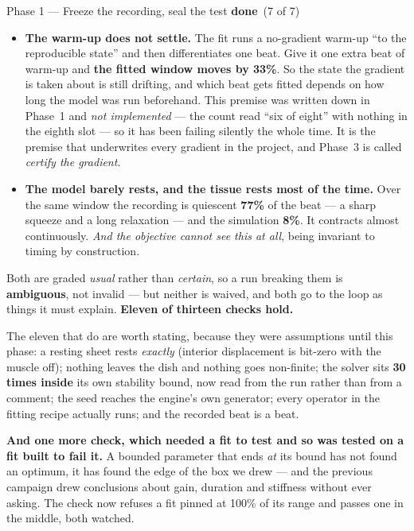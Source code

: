 \documentclass[11pt,a4paper]{article}
\newcommand{\dn}{\textcolor{good}{\textbf{done}}}
\begin{document}
\begin{phasebox}{Phase 1 --- Freeze the recording, seal the test \hfill \dn\ (7 of 7)}
\begin{itemize}
\item \textbf{The warm-up does not settle.} The fit runs a no-gradient warm-up ``to the reproducible
state'' and then differentiates one beat. Give it one extra beat of warm-up and \textbf{the fitted
window moves by 33\%}. So the state the gradient is taken about is still drifting, and which beat
gets fitted depends on how long the model was run beforehand. This premise was written down in
Phase~1 and \emph{not implemented} --- the count read ``six of eight'' with nothing in the eighth
slot --- so it has been failing silently the whole time. It is the premise that underwrites every
gradient in the project, and Phase~3 is called \emph{certify the gradient}.
\item \textbf{The model barely rests, and the tissue rests most of the time.} Over the same window
the recording is quiescent \textbf{77\%} of the beat --- a sharp squeeze and a long relaxation ---
and the simulation \textbf{8\%}. It contracts almost continuously. \emph{And the objective cannot
see this at all}, being invariant to timing by construction.
\end{itemize}

Both are graded \emph{usual} rather than \emph{certain}, so a run breaking them is
\textbf{ambiguous}, not invalid --- but neither is waived, and both go to the loop as things it must
explain. \textbf{Eleven of thirteen checks hold.}

The eleven that do are worth stating, because they were assumptions until this phase: a resting
sheet rests \emph{exactly} (interior displacement is bit-zero with the muscle off); nothing leaves
the dish and nothing goes non-finite; the solver sits \textbf{30 times inside} its own stability
bound, now read from the run rather than from a comment; the seed reaches the engine's own
generator; every operator in the fitting recipe actually runs; and the recorded beat is a beat.

\textbf{And one more check, which needed a fit to test and so was tested on a fit built to fail
it.} A bounded parameter that ends \emph{at} its bound has not found an optimum, it has found the
edge of the box we drew --- and the previous campaign drew conclusions about gain, duration and
stiffness without ever asking. The check now refuses a fit pinned at 100\% of its range and passes
one in the middle, both watched.


\end{phasebox}
\end{document}
